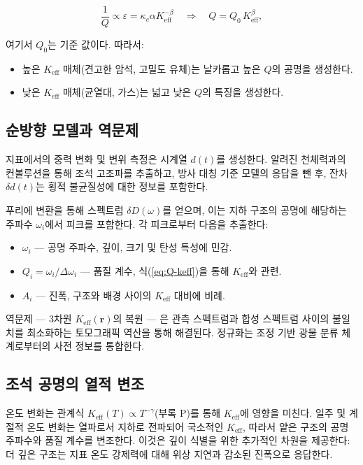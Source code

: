 \documentclass[12pt,a4paper]{article}
\theoremstyle{remark}
\newcommand{\Keff}{K_{\mathrm{eff}}}
\newcommand{\kappac}{\kappa_c}
\newcommand{\eps}{\varepsilon}
\begin{document}
	\begin{equation}
		\frac{1}{Q} \propto \eps = \kappac \alpha \Keff^{-\beta} \quad \Longrightarrow \quad Q = Q_0 \, \Keff^{\beta},
		\label{eq:Q-keff}
	\end{equation}
	
	여기서 \(Q_0\)는 기준 값이다. 따라서:
	\begin{itemize}
		\item 높은 \(\Keff\) 매체(견고한 암석, 고밀도 유체)는 날카롭고 높은 \(Q\)의 공명을 생성한다.
		\item 낮은 \(\Keff\) 매체(균열대, 가스)는 넓고 낮은 \(Q\)의 특징을 생성한다.
	\end{itemize}
	
	\subsection{순방향 모델과 역문제}
	
	지표에서의 중력 변화 및 변위 측정은 시계열 \(d(t)\)를 생성한다. 알려진 천체력과의 컨볼루션을 통해 조석 고조파를 추출하고, 방사 대칭 기준 모델의 응답을 뺀 후, 잔차 \(\delta d(t)\)는 횡적 불균질성에 대한 정보를 포함한다.
	
	푸리에 변환을 통해 스펙트럼 \(\delta D(\omega)\)를 얻으며, 이는 지하 구조의 공명에 해당하는 주파수 \(\omega_i\)에서 피크를 포함한다. 각 피크로부터 다음을 추출한다:
	
	\begin{itemize}
		\item \(\omega_i\) — 공명 주파수, 깊이, 크기 및 탄성 특성에 민감.
		\item \(Q_i = \omega_i / \Delta \omega_i\) — 품질 계수, 식(\ref{eq:Q-keff})을 통해 \(\Keff\)와 관련.
		\item \(A_i\) — 진폭, 구조와 배경 사이의 \(\Keff\) 대비에 비례.
	\end{itemize}
	
	역문제 — 3차원 \(\Keff(\mathbf{r})\)의 복원 — 은 관측 스펙트럼과 합성 스펙트럼 사이의 불일치를 최소화하는 토모그래픽 역산을 통해 해결된다. 정규화는 조정 기반 광물 분류 체계로부터의 사전 정보를 통합한다.
	
	\subsection{조석 공명의 열적 변조}
	\label{sec:thermal-modulation}
	
	온도 변화는 관계식 \(\Keff(T) \propto T^{-\gamma}\)(부록 P)를 통해 \(\Keff\)에 영향을 미친다. 일주 및 계절적 온도 변화는 열파로서 지하로 전파되어 국소적인 \(\Keff\), 따라서 얕은 구조의 공명 주파수와 품질 계수를 변조한다. 이것은 깊이 식별을 위한 추가적인 차원을 제공한다: 더 깊은 구조는 지표 온도 강제력에 대해 위상 지연과 감소된 진폭으로 응답한다.
	
\end{document}
